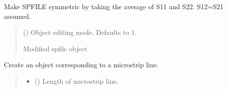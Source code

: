 \documentclass[letterpaper,10pt,english]{sphinxmanual}
\begin{document}
\begin{fulllineitems}
\begin{fulllineitems}
\end{fulllineitems}


\begin{fulllineitems}
\label{\detokenize{touchstone:touchstone.spfile.make_symmetric}}
\pysigstartsignatures
{}
\pysigstopsignatures
\sphinxAtStartPar
Make SPFILE symmetric by taking the average of S11 and S22. S12=S21 assumed.
\begin{quote}\begin{description}
\sphinxAtStartPar
{} (\sphinxstyleliteralemphasis{\sphinxupquote{, }}) \textendash{} Object editing mode. Defaults to \sphinxhyphen{}1.

\sphinxAtStartPar
Modified spfile object

\sphinxAtStartPar
{\hyperref[\detokenize{touchstone:touchstone.spfile}]{}}

\end{description}\end{quote}

\end{fulllineitems}


\begin{fulllineitems}
\label{\detokenize{touchstone:touchstone.spfile.microstripline}}
\pysigstartsignatures
{}
\pysigstopsignatures
\sphinxAtStartPar
Create an  object corresponding to a microstrip line.
\begin{quote}\begin{description}
\begin{itemize}
\item {} 
\sphinxAtStartPar
{} () \textendash{} Length of microstrip line.


\end{itemize}
\end{description}
\end{quote}
\end{fulllineitems}
\end{fulllineitems}
\end{document}

